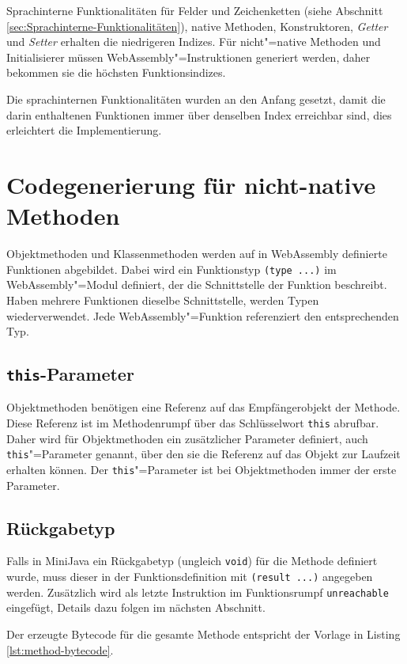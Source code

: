 \pagebreak
Sprachinterne Funktionalitäten für Felder und Zeichenketten (siehe Abschnitt \ref{sec:Sprachinterne-Funktionalitäten}), native Methoden, Konstruktoren, \emph{Getter} und \emph{Setter} erhalten die niedrigeren Indizes. Für nicht"=native Methoden und Initialisierer müssen WebAssembly"=Instruktionen generiert werden, daher bekommen sie die höchsten Funktionsindizes.


Die sprachinternen Funktionalitäten wurden an den Anfang gesetzt, damit die darin enthaltenen Funktionen immer über denselben Index erreichbar sind, dies erleichtert die Implementierung.

\section{Codegenerierung für nicht-native Methoden}

Objektmethoden und Klassenmethoden werden auf in WebAssembly definierte Funktionen abgebildet. Dabei wird ein Funktionstyp \lstinline{(type ...)} im WebAssembly"=Modul definiert, der die Schnittstelle der Funktion beschreibt. Haben mehrere Funktionen dieselbe Schnittstelle, werden Typen wiederverwendet. Jede WebAssembly"=Funktion referenziert den entsprechenden Typ.

\subsection{\lstinline{this}-Parameter}
\label{subsec:this-Parameter}
Objektmethoden benötigen eine Referenz auf das Empfängerobjekt der Methode. Diese Referenz ist im Methodenrumpf über das Schlüsselwort \lstinline{this} abrufbar. Daher wird für Objektmethoden ein zusätzlicher Parameter definiert, auch \lstinline{this}"=Parameter genannt, über den sie die Referenz auf das Objekt zur Laufzeit erhalten können. Der \lstinline{this}"=Parameter ist bei Objektmethoden immer der erste Parameter.

\subsection{Rückgabetyp}
Falls in MiniJava ein Rückgabetyp (ungleich \lstinline{void}) für die Methode definiert wurde, muss dieser in der Funktionsdefinition mit \lstinline{(result ...)} angegeben werden. Zusätzlich wird als letzte Instruktion im Funktionsrumpf \lstinline{unreachable} eingefügt, Details dazu folgen im nächsten Abschnitt.

Der erzeugte Bytecode für die gesamte Methode entspricht der Vorlage in Listing \ref{lst:method-bytecode}.

